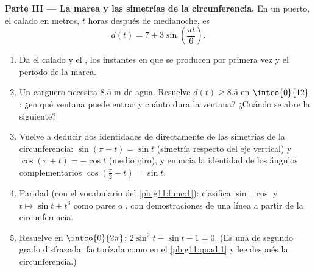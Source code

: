 \begin{problem}
\medskip
\noindent\textbf{Parte III --- La marea y las simetrías de la
circunferencia.}
En un puerto, el calado en metros, $t$ horas después de medianoche, es
\[
d(t) = 7 + 3 \sin\!\left(\frac{\pi t}{6}\right).
\]
\begin{enumerate}[resume]
  \item Da el calado  y el , los instantes en que se producen
        por primera vez y el periodo de la marea.
  \item Un carguero necesita $8.5$ m de agua. Resuelve $d(t) \geq 8.5$ en
        $\intco{0}{12}$: ¿en qué ventana puede entrar y cuánto dura la
        ventana? ¿Cuándo se abre la siguiente?
  \item Vuelve a deducir dos identidades de 
        directamente de las simetrías de la circunferencia:
        $\sin(\pi - t) = \sin t$ (simetría respecto del eje vertical) y
        $\cos(\pi + t) = -\cos t$ (medio giro), y enuncia la identidad de
        los ángulos complementarios
        $\cos\left(\frac\pi2 - t\right) = \sin t$.
  \item Paridad (con el vocabulario del \cref{pb:g11:func:1}): clasifica
        $\sin$, $\cos$ y $t \mapsto \sin t + t^3$ como pares o ,
        con demostraciones de una línea a partir de la circunferencia.
  \item Resuelve en $\intco{0}{2\pi}$: $2\sin^2 t - \sin t - 1 = 0$. (Es
        una  de segundo grado disfrazada: factorízala como en el
        \cref{pb:g11:quad:1} y lee después la circunferencia.)
\end{enumerate}


\end{problem}
